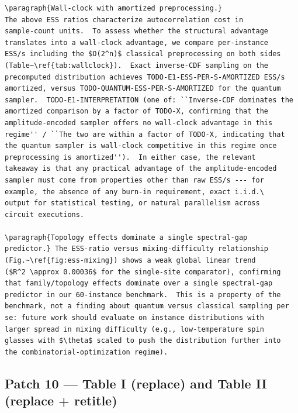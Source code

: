\begin{verbatim}
\paragraph{Wall-clock with amortized preprocessing.}
The above ESS ratios characterize autocorrelation cost in
sample-count units.  To assess whether the structural advantage
translates into a wall-clock advantage, we compare per-instance
ESS/s including the $O(2^n)$ classical preprocessing on both sides
(Table~\ref{tab:wallclock}).  Exact inverse-CDF sampling on the
precomputed distribution achieves TODO-E1-ESS-PER-S-AMORTIZED ESS/s
amortized, versus TODO-QUANTUM-ESS-PER-S-AMORTIZED for the quantum
sampler.  TODO-E1-INTERPRETATION (one of: ``Inverse-CDF dominates the
amortized comparison by a factor of TODO-X, confirming that the
amplitude-encoded sampler offers no wall-clock advantage in this
regime'' / ``The two are within a factor of TODO-X, indicating that
the quantum sampler is wall-clock competitive in this regime once
preprocessing is amortized'').  In either case, the relevant
takeaway is that any practical advantage of the amplitude-encoded
sampler must come from properties other than raw ESS/s --- for
example, the absence of any burn-in requirement, exact i.i.d.\
output for statistical testing, or natural parallelism across
circuit executions.

\paragraph{Topology effects dominate a single spectral-gap
predictor.} The ESS-ratio versus mixing-difficulty relationship
(Fig.~\ref{fig:ess-mixing}) shows a weak global linear trend
($R^2 \approx 0.00036$ for the single-site comparator), confirming
that family/topology effects dominate over a single spectral-gap
predictor in our 60-instance benchmark.  This is a property of the
benchmark, not a finding about quantum versus classical sampling per
se: future work should evaluate on instance distributions with
larger spread in mixing difficulty (e.g., low-temperature spin
glasses with $\theta$ scaled to push the distribution further into
the combinatorial-optimization regime).
\end{verbatim}

\subsection*{Patch 10 --- Table I (replace) and Table II (replace + retitle)}

